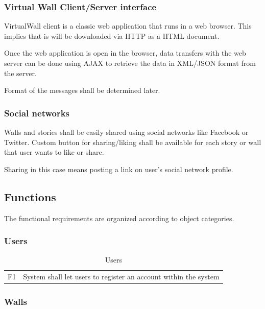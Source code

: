 \documentclass[11pt]{book}
\begin{document}
\subsubsection{Virtual Wall Client/Server interface}
VirtualWall client is a classic web application that runs in a web browser. This implies that is will be downloaded via HTTP as a HTML document.

Once the web application is open in the browser, data transfers with the web server can be done using AJAX to retrieve the data in XML/JSON format from the server.

Format of the messages shall be determined later.

\subsubsection{Social networks}\label{sec:req_social_networks}
Walls and stories shall be easily shared using social networks like Facebook or Twitter. Custom button for sharing/liking shall be available for each story or wall that user wants to like or share.

Sharing in this case means posting a link on user's social network profile.

\subsection{Functions}
The functional requirements are organized according to object categories.

\subsubsection{Users}

\begin{table}[H]
\centering
\begin{tabular}{ l  p{11cm} }
F1 & System shall let users to register an account within the system\\
\end{tabular}
\label{tab:req_users}
\caption{Users}
\end{table}

\subsubsection{Walls}
\end{document}

